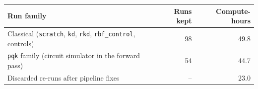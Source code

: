 \begin{tabular}{@{}lrr@{}}
\toprule
Run family & Runs kept & Compute-hours \\
\midrule
Classical (\texttt{scratch}, \texttt{kd}, \texttt{rkd}, \texttt{rbf\_control}, controls) & 98 & 49.8 \\
\texttt{pqk} family (circuit simulator in the forward pass) & 54 & 44.7 \\
\midrule
Discarded re-runs after pipeline fixes & -- & 23.0 \\
\bottomrule
\end{tabular}
